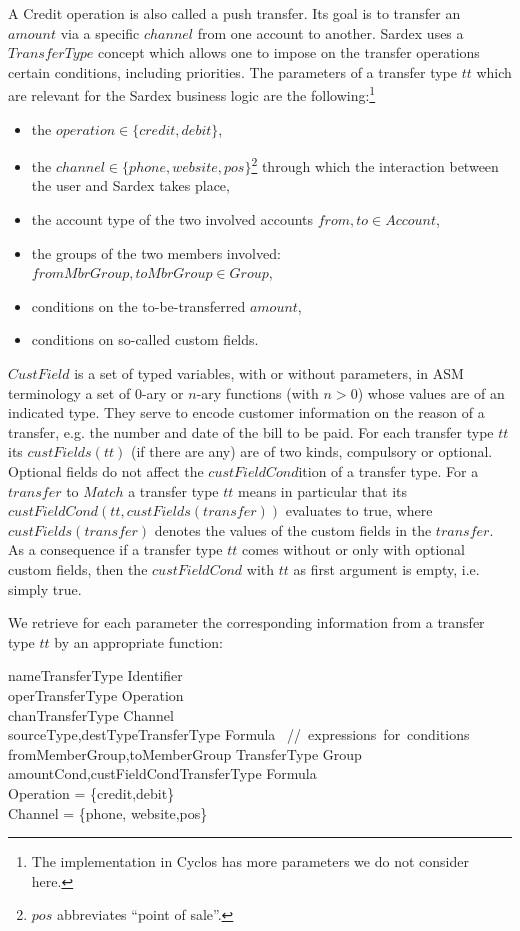 A Credit operation is also called a push transfer. Its goal is to transfer an $amount$ via a specific $channel$ from one account to another. Sardex uses a $TransferType$ concept which allows one to impose on the transfer operations certain conditions, including priorities. The parameters of a transfer type $tt$ which are relevant for the Sardex business logic are the following:\footnote{The implementation in Cyclos has more parameters we do not consider here.}
\begin{itemize}
	\item the $operation \in \{credit, debit\}$,
	\item the $channel \in \{phone,website,pos\}$\footnote{$pos$ abbreviates ``point of sale''.} through which the interaction between the user and Sardex takes place,
	\item the account type of the two involved accounts $from,to \in Account$,
	\item the groups of the two members involved: $fromMbrGroup,toMbrGroup \in Group$,
	\item conditions on the to-be-transferred $amount$, 
	\item conditions on so-called custom fields.
\end{itemize}

$CustField$ is a set of typed variables, with or without parameters, in ASM terminology a set of 0-ary or $n$-ary functions (with $n>0$) whose values are of an indicated type. They serve to encode customer information on the reason of a transfer, e.g. the number and date of the bill to be paid. For each transfer type $tt$ its $custFields(tt)$ (if there are any) are of two kinds, compulsory or optional. Optional fields do not affect the $custFieldCond$ition of a transfer type. For a $transfer$ to $Match$ a transfer type $tt$ means in particular that its $custFieldCond(tt,custFields(transfer))$ evaluates to true, where $custFields(transfer)$ denotes the values of the custom fields in the $transfer$. As a consequence if a transfer type $tt$ comes without or only with optional custom fields, then the $custFieldCond$ with $tt$ as first argument is empty, i.e. simply true.

We retrieve for each parameter the corresponding information from a transfer type $tt$ by an appropriate function:

\begin{asm}
name\colon TransferType \rightarrow Identifier \\
oper\colon TransferType \rightarrow Operation\\
chan\colon TransferType \rightarrow Channel \\
sourceType,destType\colon TransferType \rightarrow Formula 
       \mbox{ // expressions for conditions}\\
fromMemberGroup,toMemberGroup \colon TransferType \rightarrow Group \\
amountCond,custFieldCond\colon TransferType \rightarrow Formula\\
\WHERE \+
    Operation = \{credit,debit\} \\
    Channel = \{phone, website,pos\}
\end{asm} 

